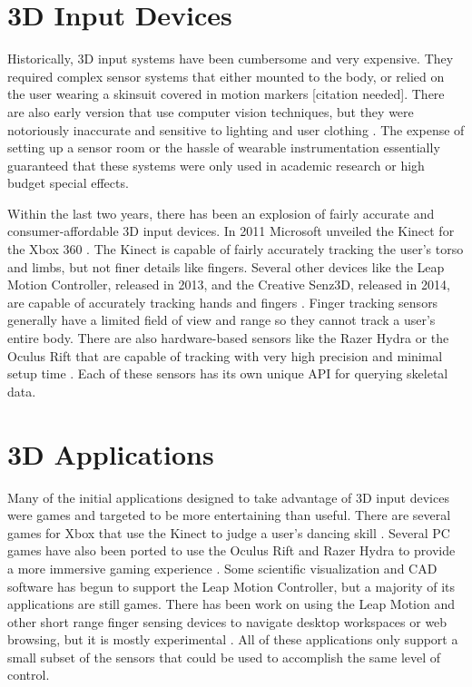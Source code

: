 \section{3D Input Devices}

Historically, 3D input systems have been cumbersome and very expensive. They required complex sensor systems that either mounted to the body, or relied on the user wearing a skinsuit covered in motion markers [citation needed]. There are also early version that use computer vision techniques, but they were notoriously inaccurate and sensitive to lighting and user clothing \cite{moeslund2006survey}. The expense of setting up a sensor room or the hassle of wearable instrumentation essentially guaranteed that these systems were only used in academic research or high budget special effects.

Within the last two years, there has been an explosion of fairly accurate and consumer-affordable 3D input devices. In 2011 Microsoft unveiled the Kinect for the Xbox 360 \cite{kinectlaunch}. The Kinect is capable of fairly accurately tracking the user’s torso and limbs, but not finer details like fingers. Several other devices like the Leap Motion Controller, released in 2013,  and the Creative Senz3D, released in 2014, are capable of accurately tracking hands and fingers \cite{weichert2013analysis,kratz2013depth}. Finger tracking sensors generally have a limited field of view and range so they cannot track a user’s entire body. There are also hardware-based sensors like the Razer Hydra or the Oculus Rift that are capable of tracking with very high precision and minimal setup time \cite{basu2012immersive}. Each of these sensors has its own unique API for querying skeletal data.

\section{3D Applications}

Many of the initial applications designed to take advantage of 3D input devices were games and targeted to be more entertaining than useful. There are several games for Xbox that use the Kinect to judge a user’s dancing skill \cite{kinect_dance}. Several PC games have also been ported to use the Oculus Rift and Razer Hydra to provide a more immersive gaming experience \cite{rift_hydra}. Some scientific visualization and CAD software has begun to support the Leap Motion Controller, but a majority of its applications are still games. There has been work on using the Leap Motion and other short range finger sensing devices to navigate desktop workspaces or web browsing, but it is mostly experimental \cite{moyle2003design}. All of these applications only support a small subset of the sensors that could be used to accomplish the same level of control.

